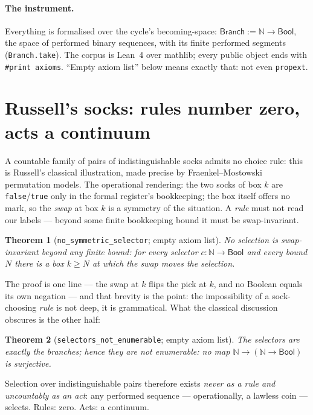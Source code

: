 \documentclass[11pt]{article}
\newtheorem{thm}{Theorem}[section]
\theoremstyle{remark}
\newcommand{\N}{\mathbb{N}}
\newcommand{\Branch}{\textsf{Branch}}
\begin{document}
\paragraph{The instrument.}  Everything is formalised over the cycle's
becoming-space: $\Branch := \N \to \mathsf{Bool}$, the space of
performed binary sequences, with its finite performed segments
(\texttt{Branch.take}).  The corpus is Lean~4 over mathlib; every public
object ends with \texttt{\#print axioms}.  ``Empty axiom list'' below
means exactly that: not even \texttt{propext}.

\section{Russell's socks: rules number zero, acts a continuum}
\label{sec:socks}

A countable family of pairs of indistinguishable socks admits no choice
rule: this is Russell's classical illustration, made precise by
Fraenkel--Mostowski permutation models.  The operational rendering: the
two socks of box $k$ are \texttt{false}/\texttt{true} only in the formal
register's bookkeeping; the box itself offers no mark, so the
\emph{swap} at box $k$ is a symmetry of the situation.  A \emph{rule}
must not read our labels --- beyond some finite bookkeeping bound it
must be swap-invariant.

\begin{thm}[\texttt{no\_symmetric\_selector}; empty axiom list]
No selection is swap-invariant beyond any finite bound: for every
selector $c : \N \to \mathsf{Bool}$ and every bound $N$ there is a box
$k \ge N$ at which the swap moves the selection.
\end{thm}

The proof is one line --- the swap at $k$ flips the pick at $k$, and no
Boolean equals its own negation --- and that brevity is the point: the
impossibility of a sock-choosing \emph{rule} is not deep, it is
grammatical.  What the classical discussion obscures is the other half:

\begin{thm}[\texttt{selectors\_not\_enumerable}; empty axiom list]
The selectors are exactly the branches; hence they are not enumerable:
no map $\N \to (\N \to \mathsf{Bool})$ is surjective.
\end{thm}

Selection over indistinguishable pairs therefore exists \emph{never as a
rule and uncountably as an act}: any performed sequence --- operationally,
a lawless coin --- selects.  Rules: zero.  Acts: a continuum.
\end{document}
